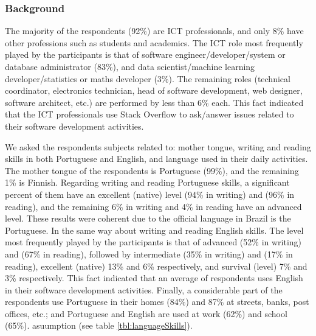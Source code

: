 \subsubsection{Background}
The majority of the respondents (92\%) are ICT professionals, and only 8\% have other professions such as students and academics. The ICT role most frequently played by the participants is that of software engineer/developer/system or database administrator (83\%), and data scientist/machine learning developer/statistics or maths developer (3\%). The remaining roles (technical coordinator, electronics technician, head of software development, web designer, software architect, etc.) are performed by less than 6\% each. This fact indicated that the ICT professionals use Stack Overflow to ask/answer issues related to their software development activities.

We asked the respondents subjects related to: mother tongue, writing and reading skills in both Portuguese and English, and language used in their daily activities. The mother tongue of the respondents is Portuguese (99\%), and the remaining 1\% is Finnish. Regarding writing and reading Portuguese skills, a significant percent of them have an excellent (native) level (94\% in writing) and (96\% in reading), and the remaining 6\% in writing and 4\% in reading have an advanced level. These results were coherent due to the official language in Brazil is the Portuguese. In the same way about writing and reading English skills. The level most frequently played by the participants is that of advanced (52\% in writing) and (67\% in reading), followed by intermediate (35\% in writing) and (17\% in reading), excellent (native) 13\% and 6\% respectively, and survival (level) 7\% and 3\% respectively. This fact indicated that an average of respondents uses English in their software development activities. Finally, a considerable part of the respondents use Portuguese in their homes (84\%) and 87\% at streets, banks, post offices, etc.; and Portuguese and English are used at work (62\%) and school (65\%).  asuumption (see table \ref{tbl:languageSkills}).

